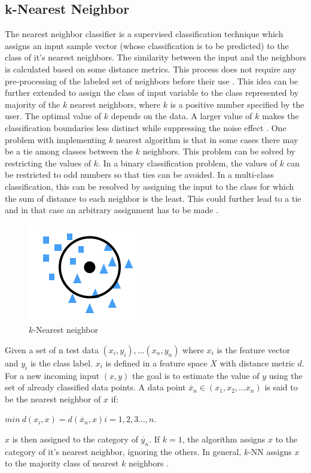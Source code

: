 \subsection{k-Nearest Neighbor}
The nearest neighbor classifier is a supervised classification technique which assigns an input sample vector (whose classification is to be predicted) to the class of it's nearest neighbors. The similarity between the input and the neighbors is calculated based on some distance metrics. This process does not require any pre-processing of the labeled set of neighbors before their use \cite{cover1967}. This idea can be further extended to assign the class of input variable to the class represented by majority of the $k$ nearest neighbors, where $k$ is a positive number specified by the user. The optimal value of $k$ depends on the data. A larger value of $k$ makes the classification boundaries less distinct while suppressing the noise effect \cite{scikit-learn}. One problem with implementing $k$ nearest algorithm is that in some cases there may be a tie among classes between the $k$ neighbors. This problem can be solved by restricting the values of $k$. In a binary classification problem, the values of $k$ can be restricted to odd numbers so that ties can be avoided. In a multi-class classification, this can be resolved by assigning the input to the class for which the sum of distance to each neighbor is the least. This could further lead to a tie and in that case an arbitrary assignment has to be made \cite{keller1985}.
\begin{figure}[htb!]
    \centering
    \includegraphics[scale=1]{files/knn.png}
    \caption{$k$-Nearest neighbor}
    \label{k-Nearest neighbor}
    \end{figure}
    \FloatBarrier


Given a set of n test data $(x_i, y_i),\dots(x_n, y_n)$ where $x_i$ is the feature vector and $y_i$ is the class label. $x_i$ is defined in a feature space $X$ with distance metric $d$. For a new incoming input $(x, y)$ the goal is to estimate the value of $y$ using the set of already classified data points. A data point $\acute{x_n} \in (x_1, x_2, \dots x_n)$ is said to be the nearest neighbor of $x$ if:
\begin{center}
$min\ d(x_i,x) = d(\acute{x_n},x) i = 1,2,3...,n.$ 
\end{center}
$x$ is then assigned to the category of $\acute{y_n}$. If $k = 1$, the algorithm assigns $x$ to the category of it's nearest neighbor, ignoring the others. In general, $k$-NN assigns $x$ to the majority class of nearest $k$ neighbors \cite{cover1967}.



